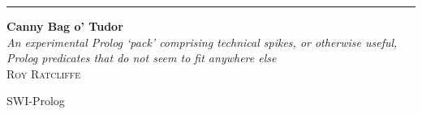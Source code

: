 \documentclass[11pt]{report}
\begin{document}
\begin{titlepage}
    \raggedleft
    \rule{1pt}{\textheight}
    \hspace{0.05\textwidth}
    \parbox[b]{0.75\textwidth}{
        {\Huge\bfseries Canny Bag o' Tudor}
        \\[2\baselineskip]
        {\large\textit{An experimental Prolog `pack' comprising technical spikes, or
        otherwise useful, Prolog predicates that do not seem to fit anywhere else}}
        \\[4\baselineskip]
        {\Large\textsc{Roy Ratcliffe}}

        \vspace{0.5\textheight}
        {\noindent SWI-Prolog}\\[\baselineskip]
    }
\end{titlepage}


\printindex
\end{document}
